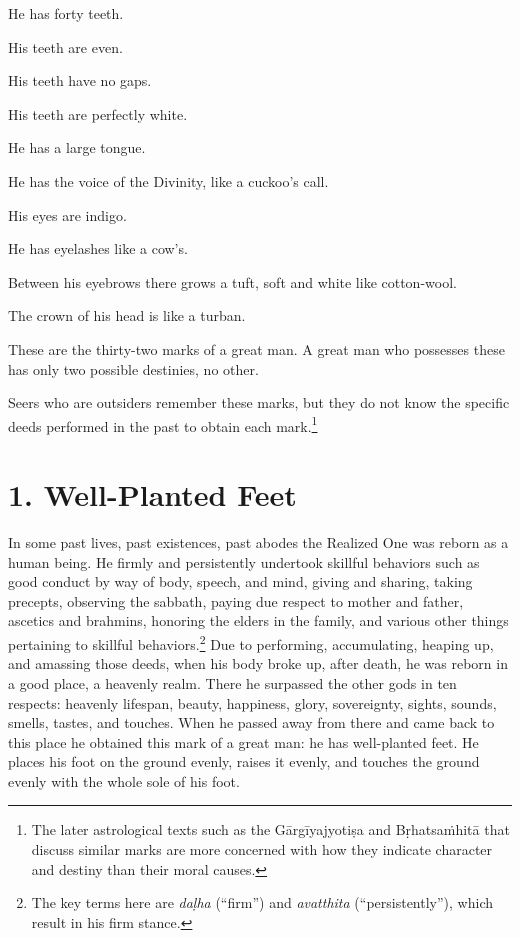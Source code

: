 \documentclass[12pt,openany]{book}%
\begin{document}
He has forty teeth. 

His teeth are even. 

His teeth have no gaps. 

His teeth are perfectly white. 

He has a large tongue. 

He has the voice of the Divinity, like a cuckoo’s call. 

His eyes are indigo. 

He has eyelashes like a cow’s. 

Between his eyebrows there grows a tuft, soft and white like cotton-wool. 

The crown of his head is like a turban. 

These are the thirty-two marks of a great man. A great man who possesses these has only two possible destinies, no other. 

Seers who are outsiders remember these marks, but they do not know the specific deeds performed in the past to obtain each mark.\footnote{The later astrological texts such as the \textsanskrit{Gārgīyajyotiṣa} and \textsanskrit{Bṛhatsaṁhitā} that discuss similar marks are more concerned with how they indicate character and destiny than their moral causes. } 

\section*{1. Well-Planted Feet }

In some past lives, past existences, past abodes the Realized One was reborn as a human being. He firmly and persistently undertook skillful behaviors such as good conduct by way of body, speech, and mind, giving and sharing, taking precepts, observing the sabbath, paying due respect to mother and father, ascetics and brahmins, honoring the elders in the family, and various other things pertaining to skillful behaviors.\footnote{The key terms here are \textit{\textsanskrit{daḷha}} (“firm”) and \textit{avatthita} (“persistently”), which result in his firm stance. } Due to performing, accumulating, heaping up, and amassing those deeds, when his body broke up, after death, he was reborn in a good place, a heavenly realm. There he surpassed the other gods in ten respects: heavenly lifespan, beauty, happiness, glory, sovereignty, sights, sounds, smells, tastes, and touches. When he passed away from there and came back to this place he obtained this mark of a great man: he has well-planted feet. He places his foot on the ground evenly, raises it evenly, and touches the ground evenly with the whole sole of his foot. 
\end{document}
